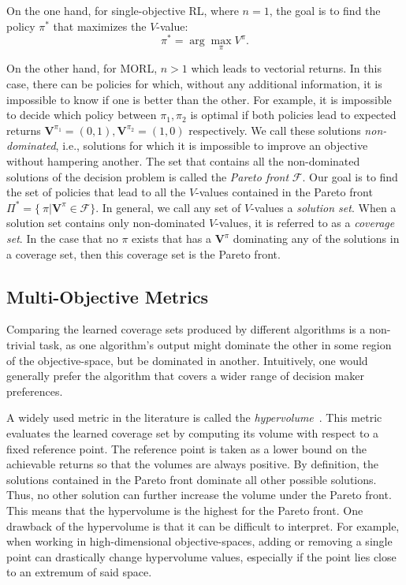 \documentclass{article}
\renewcommand{\cite}[1]{\citep{#1}}
\newcommand{\mdppolicy}{\pi}
\newcommand{\mdpvaluefunction}{V}
\newcommand{\momdpvaluefunction}{\mathbf{V}}
\begin{document}
On the one hand, for single-objective RL, where $n = 1$, the goal is to find the policy $\mdppolicy^{*}$ that maximizes the $\mdpvaluefunction$-value:
\begin{equation}
\mdppolicy^*= \arg\max_\mdppolicy \mdpvaluefunction^\mdppolicy.
\end{equation}

On the other hand, for MORL, $n > 1$ which leads to vectorial returns. In this case, there can be policies for which, without any additional information, it is impossible to know if one is better than the other. For example, it is impossible to decide which policy between $\mdppolicy_1, \mdppolicy_2$ is optimal if both policies lead to expected returns $\momdpvaluefunction^{\mdppolicy_1}=(0,1), \momdpvaluefunction^{\mdppolicy_2}=(1,0)$ respectively. We call these solutions \emph{non-dominated}, i.e., solutions for which it is impossible to improve an objective without hampering another. The set that contains all the non-dominated solutions of the decision problem is called the \emph{Pareto front} $\mathcal{F}$. Our goal is to find the set of policies that lead to all the $\mdpvaluefunction$-values contained in the Pareto front $\Pi^* = \{\ \pi | \momdpvaluefunction^{\pi} \in \mathcal{F}\}$. In general, we call any set of $\mdpvaluefunction$-values a \emph{solution set}. When a solution set contains only  non-dominated $\mdpvaluefunction$-values, it is referred to as a \emph{coverage set}. In the case that no $\mdppolicy$ exists that has a $\momdpvaluefunction^{\pi}$ dominating any of the solutions in a coverage set, then this coverage set is the Pareto front.

\subsection{Multi-Objective Metrics}
Comparing the learned coverage sets produced by different algorithms is a non-trivial task, as one algorithm's output might dominate the other in some region of the objective-space, but be dominated in another. Intuitively, one would generally prefer the algorithm that covers a wider range of decision maker preferences. %

A widely used metric in the literature is called the \emph{hypervolume}~\cite{zitzler2003}. This metric evaluates the learned coverage set by computing its volume with respect to a fixed reference point. The reference point is taken as a lower bound on the achievable returns so that the volumes are always positive. By definition, the solutions contained in the Pareto front dominate all other possible solutions. Thus, no other solution can further increase the volume under the Pareto front. This means that the hypervolume is the highest for the Pareto front. One drawback of the hypervolume is that it can be difficult to interpret. For example, when working in high-dimensional objective-spaces, adding or removing a single point can drastically change hypervolume values, especially if the point lies close to an extremum of said space.
\end{document}

